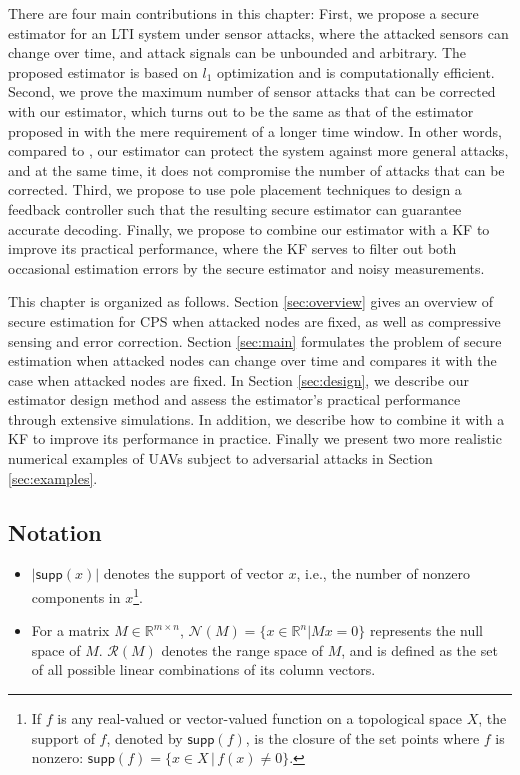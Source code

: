 \documentclass[../../thesis.tex]{subfiles}
\newcommand{\norm}[1]{\left\lVert#1\right\rVert}
\begin{document}
There are four main contributions in this chapter:
First, we propose a secure estimator for an LTI system under sensor attacks, where the attacked sensors can change over time, and attack signals can be unbounded and arbitrary.
The proposed estimator is based on $l_1$ optimization and is computationally efficient.
Second, we prove the maximum number of sensor attacks that can be corrected with our estimator, which turns out to be the same as that of the estimator proposed in \cite{Fawzi:2014} with the mere requirement of a longer time window. In other words, compared to \cite{Fawzi:2014}, our estimator can protect the system against more general attacks, and at the same time, it does not compromise the number of attacks that can be corrected.
Third, we propose to use pole placement techniques to design a feedback controller such that the resulting secure estimator can guarantee accurate decoding.
Finally, we propose to combine our estimator with a KF to improve its practical performance, where the KF serves to filter out both occasional estimation errors by the secure estimator and noisy measurements.


This chapter is organized as follows. Section \ref{sec:overview} gives an overview of secure estimation for CPS when attacked nodes are fixed, as well as compressive sensing and error correction. Section \ref{sec:main} formulates the problem of secure estimation when attacked nodes can change over time and compares it with the case when attacked nodes are fixed. In Section \ref{sec:design}, we describe our estimator design method and assess the estimator's practical performance through extensive simulations. In addition, we describe how to combine it with a KF to improve its performance in practice. Finally we present two more realistic numerical examples of UAVs subject to adversarial attacks in Section \ref{sec:examples}. 

\subsection{Notation}
\begin{itemize}
\item 
$\lvert \textsf{supp} (x) \rvert $  denotes the support of vector $x$, i.e., the number of nonzero components in $x$\footnote{If $f$ is any real-valued or vector-valued function on a topological space $X$, the support of $f$, denoted by $\textsf{supp}(f)$, is the closure of the set points where $f$ is nonzero: $\textsf{supp}(f)  = \{ x \in X \,|\, f(x) \neq 0 \}$.}. 
\item  
For a matrix $M \in \mathbb{R}^{m \times n}$, $\mathcal{N} (M) = \{ x \in \mathbb{R}^n \lvert M x = 0 \}$ represents the null space of $M$. $\mathcal{R}(M)$ denotes the range space of $M$, and is defined as the set of all possible linear combinations of its column vectors.
\end{itemize}
\end{document}
